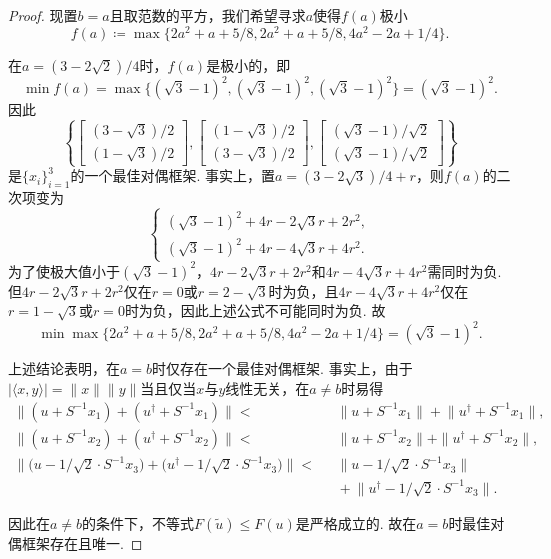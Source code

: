 \documentclass[cn,11pt,a4paper,founder]{elegantpaper}
\begin{document}
\begin{proof}
现置\(b=a\)且取范数的平方，我们希望寻求\(a\)使得\(f(a)\)极小
\[
	f(a)\coloneqq\max\{2a^2+a+5/8,2a^2+a+5/8,4a^2-2a+1/4\}.
\]

在\(a=(3-2\sqrt{2})/4\)时，\(f(a)\)是极小的，即
\[
	\min f(a)=\max\big\{(\sqrt{3}-1)^2,(\sqrt{3}-1)^2,(\sqrt{3}-1)^2\big\}=(\sqrt{3}-1)^2.
\]
因此
\[
	\left\{\begin{bmatrix}
	(3-\sqrt{3})/2\\[2pt]
	(1-\sqrt{3})/2
	\end{bmatrix},
	\begin{bmatrix}
	(1-\sqrt{3})/2\\[2pt]
	(3-\sqrt{3})/2
	\end{bmatrix},
	\begin{bmatrix}
	(\sqrt{3}-1)/\sqrt{2}\\[2pt]
	(\sqrt{3}-1)/\sqrt{2}
	\end{bmatrix}\right\}
\]
是\(\{x_i\}_{i=1}^3\)的一个最佳对偶框架. 事实上，置\(a=(3-2\sqrt{3})/4+r\)，则\(f(a)\)的二次项变为
\[
	\begin{cases}
	(\sqrt{3}-1)^2+4r-2\sqrt{3}r+2r^2,\\
	(\sqrt{3}-1)^2+4r-4\sqrt{3}r+4r^2.
	\end{cases}
\]
为了使极大值小于\((\sqrt{3}-1)^2\)，\(4r-2\sqrt{3}r+2r^2\)和\(4r-4\sqrt{3}r+4r^2\)需同时为负. 但\(4r-2\sqrt{3}r+2r^2\)仅在\(r=0\)或\(r=2-\sqrt{3}\)时为负，且\(4r-4\sqrt{3}r+4r^2\)仅在\(r=1-\sqrt{3}\)或\(r=0\)时为负，因此上述公式不可能同时为负. 故
\[
	\min\max\big\{2a^2+a+5/8,2a^2+a+5/8,4a^2-2a+1/4\big\}=(\sqrt{3}-1)^2.
\]

上述结论表明，在\(a=b\)时仅存在一个最佳对偶框架. 事实上，由于\(|\langle x,y\rangle|=\|x\|\|y\|\)当且仅当\(x\)与\(y\)线性无关，在\(a\ne b\)时易得
\begin{align*}
\big\|(u+S^{-1}x_1)+(u^{\dagger}+S^{-1}x_1)\big\|<&\text{ }\big\|u+S^{-1}x_1\big\|+\big\|u^{\dagger}+S^{-1}x_1\big\|,\\
\big\|(u+S^{-1}x_2)+(u^{\dagger}+S^{-1}x_2)\big\|<&\text{ }\big\|u+S^{-1}x_2\big\|+\|u^{\dagger}+S^{-1}x_2\big\|,\\
\big\|\big(u-1/\sqrt{2}\cdot S^{-1}x_3\big)+\big(u^{\dagger}-1/\sqrt{2}\cdot S^{-1}x_3\big)\big\|<&\text{ }\big\|u-1/\sqrt{2}\cdot S^{-1}x_3\big\|\\
&\text{ }+\big\|u^{\dagger}-1/\sqrt{2}\cdot S^{-1}x_3\big\|.
\end{align*}

因此在\(a\ne b\)的条件下，不等式\(F(\tilde{u})\leqslant F(u)\)是严格成立的. 故在\(a=b\)时最佳对偶框架存在且唯一.
\end{proof}
\end{document}
